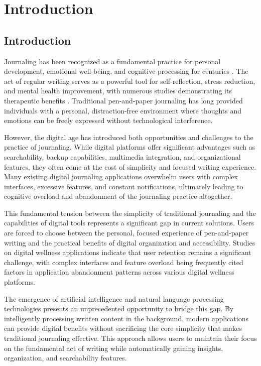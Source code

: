 \chapter{Introduction}\label{ch:intro}


\section{Introduction}\label{sec:introch1}

Journaling has been recognized as a fundamental practice for personal development, emotional well-being, and cognitive processing for centuries \cite{pennebaker1999forming}. The act of regular writing serves as a powerful tool for self-reflection, stress reduction, and mental health improvement, with numerous studies demonstrating its therapeutic benefits \cite{sloan2015efficacy}. Traditional pen-and-paper journaling has long provided individuals with a personal, distraction-free environment where thoughts and emotions can be freely expressed without technological interference.

However, the digital age has introduced both opportunities and challenges to the practice of journaling. While digital platforms offer significant advantages such as searchability, backup capabilities, multimedia integration, and organizational features, they often come at the cost of simplicity and focused writing experience. Many existing digital journaling applications overwhelm users with complex interfaces, excessive features, and constant notifications, ultimately leading to cognitive overload and abandonment of the journaling practice altogether.

This fundamental tension between the simplicity of traditional journaling and the capabilities of digital tools represents a significant gap in current solutions. Users are forced to choose between the personal, focused experience of pen-and-paper writing and the practical benefits of digital organization and accessibility. Studies on digital wellness applications indicate that user retention remains a significant challenge, with complex interfaces and feature overload being frequently cited factors in application abandonment patterns across various digital wellness platforms.

The emergence of artificial intelligence and natural language processing technologies presents an unprecedented opportunity to bridge this gap. By intelligently processing written content in the background, modern applications can provide digital benefits without sacrificing the core simplicity that makes traditional journaling effective. This approach allows users to maintain their focus on the fundamental act of writing while automatically gaining insights, organization, and searchability features.

